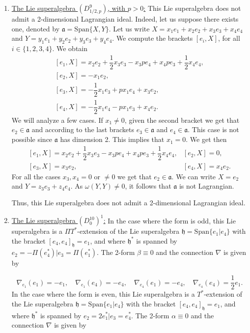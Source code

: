 \documentclass[12pt]{amsart}
\newcommand{\fh}{\mathfrak{h}}
\begin{document}
\begin{enumerate}
    \item \underline{The Lie superalgebra $(D^{9}_{1/2, p})$, with $p>0$:} This Lie superalgebra does not admit a 2-dimensional Lagrangian ideal. Indeed, let us suppose there exists one, denoted by $\mathfrak{a}=\mathrm{Span}\{X,Y\}$. Let us write $X=x_1e_1+x_2e_2+x_3e_3+x_4e_4$ and $Y=y_1e_1+y_2e_2+y_3e_3+y_4e_4$. 
    We compute the brackets  $[e_i,X]$,  for all $i\in \{1,2,3,4\}$. We obtain 
    \[ 
    \begin{array}{l}
    [e_1, X]=x_2e_2 + \dfrac{1}{2}x_3 e_3 - x_3pe_4+x_4pe_3+\dfrac{1}{2}x_4e_4, \\[2mm]
    [e_2, X]=-x_1e_2,\\[2mm]
    [e_3,X]=-\dfrac{1}{2}x_1 e_3+px_1e_4+x_3 e_2,\\[3mm]
    [e_4, X]=-\dfrac{1}{2}x_1 e_4-px_1e_3+x_4 e_2.
    \end{array}
    \]
    We will analyze a few cases. If $x_1 \neq 0$, given the second bracket we get that $e_2 \in \mathfrak{a}$ and according to the last brackets $e_3 \in \mathfrak{a}$ and $e_4 \in \mathfrak{a}$. This case is not possible since $\mathfrak{a}$ has dimension 2. 
    This implies that $x_1=0$. We get then
    \[
    \begin{array}{ll}
    [e_1, X]=x_2e_2 + \dfrac{1}{2}x_3 e_3 - x_3pe_4+x_4pe_3+\dfrac{1}{2}x_4e_4, & [e_2, X]=0,\\[2mm]
    [e_3,X]=x_3 e_2, & [e_4, X]=x_4 e_2.
    \end{array}
    \]
    For all the cases $x_3, x_4 =0$ or $\neq 0$ we get that $e_2 \in \mathfrak{a}$. We can write $X=e_2$ and $Y=z_3e_3+z_4e_4$. As $\omega(Y,Y)\not = 0$, it follows that  $\mathfrak{a}$ is not Lagrangian. 
    
    Thus, this Lie superalgebra does not admit a 2-dimensional Lagrangian ideal.
     
    \item \underline{The Lie superalgebra $(D^{10}_{0})^1$:} In the case where the form is odd, this Lie superalgebra is a $\Pi T^*$-extension of the Lie superalgebra $\mathfrak{h}=\mathrm{Span}\{e_1 | e_4\}$ with the bracket $[e_4,e_4]_\fh = e_1$, and where $\mathfrak{h}^*$ is spanned by $e_2 = - \Pi(e_4^{*}) | e_3 = \Pi(e_1^{*})$. The 2-form $\beta \equiv 0$ and the connection $\nabla$ is given by
    
    \[\nabla_{e_1}(e_1) =- e_1,\quad  \nabla_{e_1}(e_4) = -  e_4, \quad  \nabla_{e_4}(e_1) = - e_4, \quad \nabla_{e_4}(e_4) = \frac{1}{2}e_1.\]
    In the case where the form is even, this Lie superalgebra is a $T^*$-extension of the Lie superalgebra $\mathfrak{h}=\mathrm{Span}\{e_1 | e_4\}$ with the bracket $[e_4,e_4]_\fh = e_1$, and where $\mathfrak{h}^*$ is spanned by $e_2 = 2 e_1^{*} | e_3 = e_4^{*}$. The 2-form $\alpha \equiv 0$ and the connection $\nabla$ is given by
    

\end{enumerate}
\end{document}
